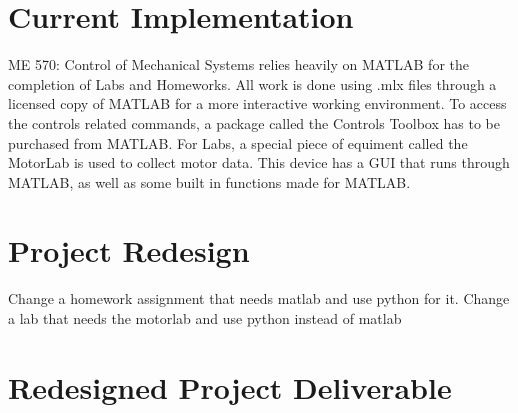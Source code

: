 \section{Current Implementation}

ME 570: Control of Mechanical Systems relies heavily on MATLAB for the completion of Labs and Homeworks. 
All work is done using .mlx files through a licensed copy of MATLAB for a more interactive working 
environment. To access the controls related commands, a package called the Controls Toolbox has to be 
purchased from MATLAB. For Labs, a special piece of equiment called the MotorLab is used to collect motor 
data. This device has a GUI that runs through MATLAB, as well as some built in functions made for MATLAB.

\section{Project Redesign}
Change a homework assignment that needs matlab and use python for it. 
Change a lab that needs the motorlab and use python instead of matlab

\section{Redesigned Project Deliverable}
